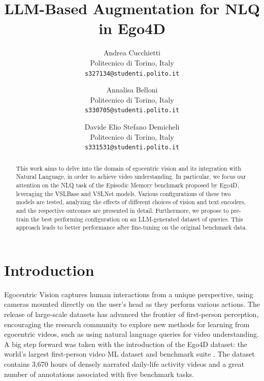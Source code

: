 \documentclass[10pt,twocolumn,letterpaper]{article}
\begin{document}
\title{LLM-Based Augmentation for NLQ in Ego4D}

\author{Andrea Cucchietti\\
Politecnico di Torino, Italy\\
{\tt\small s327134@studenti.polito.it}
\and
Annalisa Belloni\\
Politecnico di Torino, Italy\\
{\tt\small s330705@studenti.polito.it}
\and
Davide Elio Stefano Demicheli\\
Politecnico di Torino, Italy\\
{\tt\small s331531@studenti.polito.it}
}
\maketitle

\begin{abstract}
    This work aims to delve into the domain of egocentric vision and its integration with Natural Language, in order to achieve video understanding. In particular, we focus our attention on the NLQ task of the Episodic Memory benchmark proposed by Ego4D, leveraging the VSLBase and VSLNet models.  
    Various configurations of these two models are tested, analyzing the effects of different choices of vision and text encoders, and
    the respective outcomes are presented in detail.  
    Furthermore, we propose to pre-train the best performing configuration on an LLM-generated dataset of queries. This approach leads to better performance after fine-tuning on the original benchmark data.
\end{abstract}

\section{Introduction}
\label{sec:intro}

Egocentric Vision captures human interactions from a unique perspective, using cameras mounted directly on the user's head as they perform various actions. The release of large-scale datasets has advanced the frontier of first-person perception, encouraging the research community to explore new methods for learning from egocentric videos, such as using natural language queries for video understanding.\\
A big step forward was taken with the introduction of the Ego4D dataset: the world's largest first-person video ML dataset and benchmark suite \cite{grauman2022ego4d}.
The dataset contains 3,670 hours of densely narrated daily-life activity videos and a great number of annotations associated with five benchmark tasks.
\end{document}
